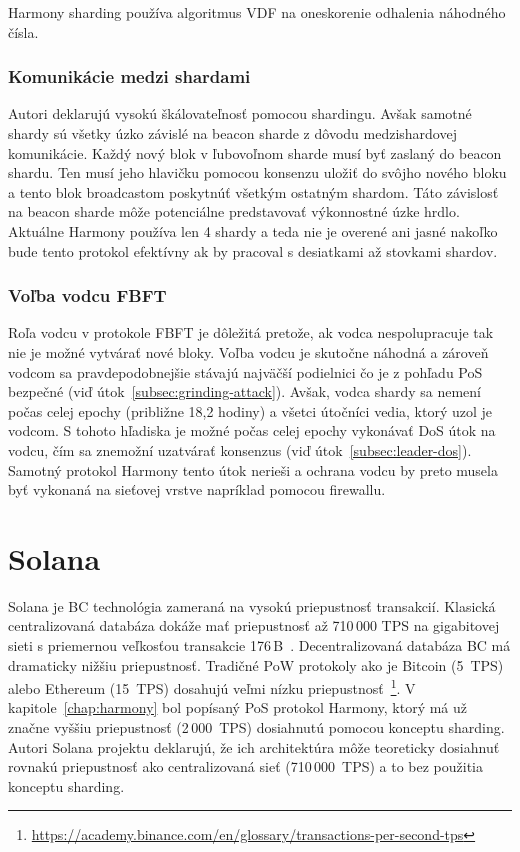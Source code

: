 Harmony sharding používa algoritmus VDF na oneskorenie odhalenia náhodného čísla. %

\subsection{Komunikácie medzi shardami}
Autori deklarujú vysokú škálovateľnosť pomocou shardingu. Avšak samotné shardy sú všetky úzko závislé na beacon sharde z dôvodu medzishardovej komunikácie. Každý nový blok v ľubovoľnom sharde musí byť zaslaný do beacon shardu. Ten musí jeho hlavičku pomocou konsenzu uložiť do svôjho nového bloku a tento blok broadcastom poskytnúť všetkým ostatným shardom. Táto závislosť na beacon sharde môže potenciálne predstavovať výkonnostné úzke hrdlo. Aktuálne Harmony používa len 4 shardy a teda nie je overené ani jasné nakoľko bude tento protokol efektívny ak by pracoval s desiatkami až stovkami shardov.

\subsection{Voľba vodcu FBFT}
Roľa vodcu v protokole FBFT je dôležitá pretože, ak vodca nespolupracuje tak nie je možné vytvárať nové bloky. Voľba vodcu je skutočne náhodná a zároveň vodcom sa pravdepodobnejšie stávajú najväčší podielnici čo je z pohľadu PoS bezpečné (viď útok~\ref{subsec:grinding-attack}). Avšak, vodca shardy sa nemení počas celej epochy (približne 18,2 hodiny) a všetci útočníci vedia, ktorý uzol je vodcom. S tohoto hľadiska je možné počas celej epochy vykonávať DoS útok na vodcu, čím sa znemožní uzatvárať konsenzus (viď útok~\ref{subsec:leader-dos}). Samotný protokol Harmony tento útok nerieši a ochrana vodcu by preto musela byť vykonaná na sieťovej vrstve napríklad pomocou firewallu.

\chapter{Solana}

Solana je BC technológia zameraná na vysokú priepustnosť transakcií. Klasická centralizovaná databáza dokáže mať priepustnosť až 710\,000 TPS na gigabitovej sieti s priemernou veľkosťou transakcie 176\,B~\cite{solanaDoc}. Decentralizovaná databáza BC má dramaticky nižšiu priepustnosť. Tradičné PoW protokoly ako je Bitcoin (5~TPS) alebo Ethereum (15~TPS) dosahujú veľmi nízku priepustnosť~\footnote{\url{https://academy.binance.com/en/glossary/transactions-per-second-tps}}.  V kapitole~\ref{chap:harmony} bol popísaný PoS protokol Harmony, ktorý má už značne vyššiu priepustnosť (2\,000~TPS) dosiahnutú pomocou konceptu sharding. Autori Solana projektu deklarujú, že ich architektúra môže teoreticky dosiahnuť rovnakú priepustnosť ako centralizovaná sieť (710\,000~TPS) a to bez použitia konceptu sharding.

